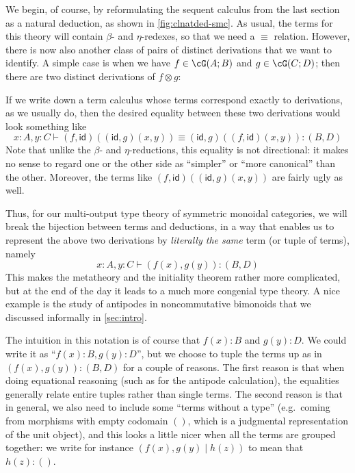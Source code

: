 \documentclass{book}
\def\idfunc{\mathsf{id}}
\let\types\vdash
\let\tensor\otimes
\begin{document}
We begin, of course, by reformulating the sequent calculus from the last section as a natural deduction, as shown in \cref{fig:clnatded-smc}.
As usual, the terms for this theory will contain $\beta$- and $\eta$-redexes, so that we need a $\equiv$ relation.
However, there is now also another class of pairs of distinct derivations that we want to identify.
A simple case is when we have $f\in \cG(A;B)$ and $g\in\cG(C;D)$; then there are two distinct derivations of $f\tensor g$:
If we write down a term calculus whose terms correspond exactly to derivations, as we usually do, then the desired equality between these two derivations would look something like
\[ x:A, y:C \types (f,\idfunc)((\idfunc,g)(x,y)) \equiv (\idfunc,g)((f,\idfunc)(x,y)) : (B,D) \]
Note that unlike the $\beta$- and $\eta$-reductions, this equality is not directional: it makes no sense to regard one or the other side as ``simpler'' or ``more canonical'' than the other.
Moreover, the terms like $(f,\idfunc)((\idfunc,g)(x,y))$ are fairly ugly as well.

Thus, for our multi-output type theory of symmetric monoidal categories, we will break the bijection between terms and deductions, in a way that enables us to represent the above two derivations by \emph{literally the same} term (or tuple of terms), namely
\[ x:A, y:C \types (f(x),g(y)):(B,D) \]
This makes the metatheory and the initiality theorem rather more complicated, but at the end of the day it leads to a much more congenial type theory.
A nice example is the study of antipodes in noncommutative bimonoids that we discussed informally in \cref{sec:intro}.

The intuition in this notation is of course that $f(x):B$ and $g(y):D$.
We could write it as ``$f(x):B,g(y):D$'', but we choose to tuple the terms up as in $(f(x),g(y)):(B,D)$ for a couple of reasons.
The first reason is that when doing equational reasoning (such as for the antipode calculation), the equalities generally relate entire tuples rather than single terms.
The second reason is that in general, we also need to include some ``terms without a type'' (e.g.\ coming from morphisms with empty codomain $()$, which is a judgmental representation of the unit object), and this looks a little nicer when all the terms are grouped together: we write for instance $(f(x),g(y)\mid h(z))$ to mean that $h(z):()$.
\end{document}
